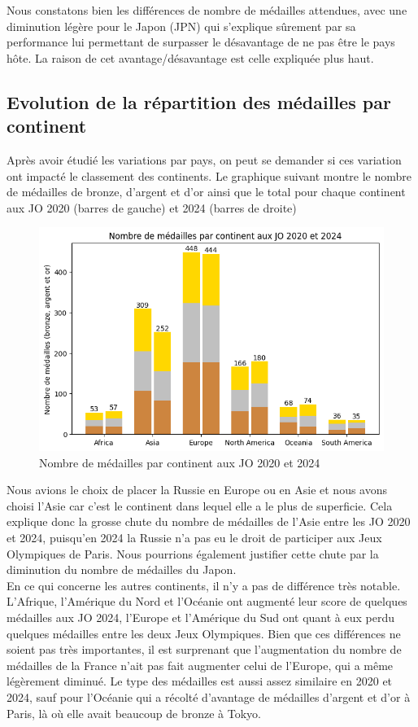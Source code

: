 \documentclass{article}
\begin{document}
Nous constatons bien les différences de nombre de médailles attendues, avec une diminution légère pour le Japon (JPN) qui s'explique sûrement par sa performance lui permettant de surpasser le désavantage de ne pas être le pays hôte. La raison de cet avantage/désavantage est celle expliquée plus haut.

\subsection{Evolution de la répartition des médailles par continent}

Après avoir étudié les variations par pays, on peut se demander si ces variation ont impacté le classement des continents. Le graphique suivant montre le nombre de médailles de bronze, d'argent et d'or ainsi que le total pour chaque continent aux JO 2020 (barres de gauche) et 2024 (barres de droite)

\begin{figure}[H]
    \centering
    \includegraphics[width=0.6\linewidth]{assets/medals_continents.png}
    \caption{Nombre de médailles par continent aux JO 2020 et 2024}
    \label{fig:enter-label}
\end{figure}

Nous avions le choix de placer la Russie en Europe ou en Asie et nous avons choisi l'Asie car c'est le continent dans lequel elle a le plus de superficie. Cela explique donc la grosse chute du nombre de médailles de l'Asie entre les JO 2020 et 2024, puisqu'en 2024 la Russie n'a pas eu le droit de participer aux Jeux Olympiques de Paris. Nous pourrions également justifier cette chute par la diminution du nombre de médailles du Japon.
\\

En ce qui concerne les autres continents, il n'y a pas de différence très notable. L'Afrique, l'Amérique du Nord et l'Océanie ont augmenté leur score de quelques médailles aux JO 2024, l'Europe et l'Amérique du Sud ont quant à eux perdu quelques médailles entre les deux Jeux Olympiques. Bien que ces différences ne soient pas très importantes, il est surprenant que l'augmentation du nombre de médailles de la France n'ait pas fait augmenter celui de l'Europe, qui a même légèrement diminué. Le type des médailles est aussi assez similaire en 2020 et 2024, sauf pour l'Océanie qui a récolté d'avantage de médailles d'argent et d'or à Paris, là où elle avait beaucoup de bronze à Tokyo.
\end{document}
